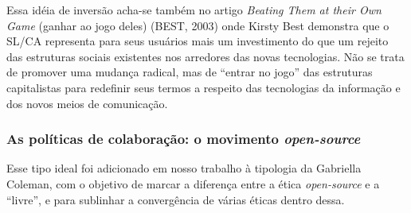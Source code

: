 Essa idéia de inversão acha-se também no artigo \emph{Beating Them at their Own Game} (ganhar ao jogo deles) (BEST, 2003) onde Kirsty Best demonstra que o SL/CA representa para seus usuários mais um investimento do que um rejeito das estruturas sociais existentes nos arredores das novas tecnologias. Não se trata de promover uma mudança radical, mas de “entrar no jogo” das estruturas capitalistas para redefinir seus termos a respeito das tecnologias da informação e dos novos meios de comunicação.

\subsubsection{As políticas de colaboração: o movimento \emph{open-source}} \label{2.2.2.d}

Esse tipo ideal foi adicionado em nosso trabalho à tipologia da Gabriella Coleman, com o objetivo de marcar a diferença entre a ética \emph{open-source} e a “livre”, e para sublinhar a convergência de várias éticas dentro dessa.


